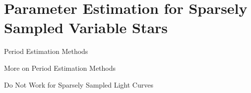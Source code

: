 \documentclass[12pt]{beamer}
\begin{document}
\section{Parameter Estimation for Sparsely Sampled Variable Stars}









\begin{frame}{Period Estimation Methods}

\end{frame}


\begin{frame}{More on Period Estimation Methods}

\end{frame}


\begin{frame}{Do Not Work for Sparsely Sampled Light Curves}

\end{frame}
\end{document}
